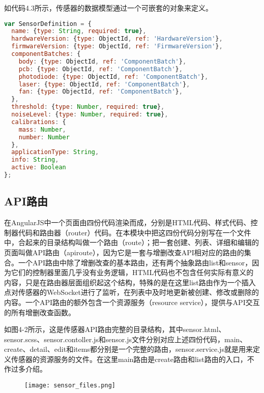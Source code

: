 如代码4.3所示，传感器的数据模型通过一个可嵌套的对象来定义。
\begin{lstlisting}[language={JavaScript}, caption={传感器的Mongoose数据模型}]
var SensorDefinition = {
  name: {type: String, required: true},
  hardwareVersion: {type: ObjectId, ref: 'HardwareVersion'},
  firmwareVersion: {type: ObjectId, ref: 'FirmwareVersion'},
  componentBatches: {
    body: {type: ObjectId, ref: 'ComponentBatch'},
    pcb: {type: ObjectId, ref: 'ComponentBatch'},
    photodiode: {type: ObjectId, ref: 'ComponentBatch'},
    laser: {type: ObjectId, ref: 'ComponentBatch'},
    fan: {type: ObjectId, ref: 'ComponentBatch'},
  },
  threshold: {type: Number, required: true},
  noiseLevel: {type: Number, required: true},
  calibrations: {
    mass: Number,
    number: Number
  },
  applicationType: String,
  info: String,
  active: Boolean
};
\end{lstlisting}
\subsection{API路由}
在AngularJS中一个页面由四份代码渲染而成，分别是HTML代码、样式代码、控制器代码和路由器（router）代码。在本模块中把这四份代码分别写在一个文件中，合起来的目录结构叫做一个路由（route）；把一套创建、列表、详细和编辑的页面叫做API路由（apiroute），因为它是一套与增删改查API相对应的路由的集合。一个API路由中除了增删改查的基本路由，还有两个抽象路由list和sensor，因为它们的控制器里面几乎没有业务逻辑，HTML代码也不包含任何实际有意义的内容，只是在路由器层面组织起这个结构，特殊的是在这里list路由作为一个插入点对传感器的WebSocket进行了监听，在列表中及时地更新被创建、修改或删除的内容。一个API路由的额外包含一个资源服务（resource service），提供与API交互的所有增删改查函数。

如图4-2所示，这是传感器API路由完整的目录结构，其中sensor.html、sensor.scss、sensor.contoller.js和sensor.js文件分别对应上述四份代码，main、create、detail、edit和items都分别是一个完整的路由，sensor.service.js就是用来定义传感器的资源服务的文件。在这里main路由是create路由和list路由的入口，不作过多介绍。
\begin{figure}[H]
 \centering
 \texttt{[image: sensor\_files.png]}
\end{figure}

